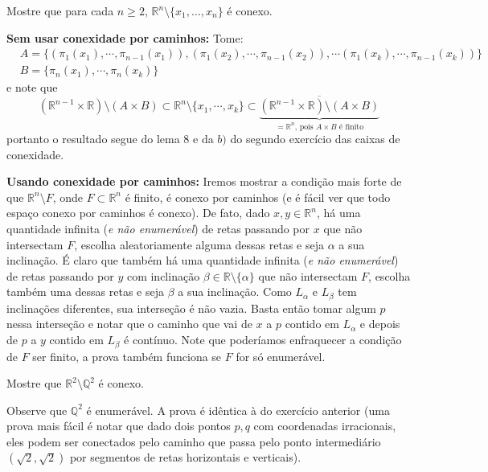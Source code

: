 \begin{Mybox}
Mostre que para cada $n \geq 2$, $\mathbb{R}^n \setminus \{x_1, \ldots, x_n \}$ é conexo.
\vspace{-.4cm}
\end{Mybox}
\vspace{-.5cm}
\begin{dem}
\textbf{Sem usar conexidade por caminhos:} Tome:
        \begin{align*}
         &A = \{(\pi_1(x_1), \cdots, \pi_{n-1}(x_1)) , (\pi_1(x_2), \cdots, \pi_{n-1}(x_2)), \cdots (\pi_1(x_k), \cdots, \pi_{n-1}(x_k)) \}\\
        &B = \{\pi_n(x_1), \cdots, \pi_n(x_k) \}
        \end{align*}
        e note que $$(\mathbb{R}^{n-1} \times \mathbb{R}) \setminus (A \times B) \subset \mathbb{R}^{n} \setminus \{x_1, \cdots, x_k \} \subset \underbrace{\overline{(\mathbb{R}^{n-1} \times \mathbb{R}) \setminus (A \times B)}}_\text{$= \mathbb{R}^n$, pois $A \times B$ é finito}$$
        portanto o resultado segue do lema $8$ e da $b)$ do segundo exercício das caixas de conexidade. \par 
\textbf{Usando conexidade por caminhos:} Iremos mostrar a condição mais forte de que $\mathbb{R}^n \setminus F$, onde $F \subset \mathbb{R}^n$ é finito, é conexo por caminhos (e é fácil ver que todo espaço conexo por caminhos é conexo). De fato, dado $x,y \in \mathbb{R}^n$, há uma quantidade infinita (\textit{e não enumerável}) de retas passando por $x$ que não intersectam $F$, escolha aleatoriamente alguma dessas retas e seja $\alpha$ a sua inclinação. É claro que também há uma quantidade infinita (\textit{e não enumerável}) de retas passando por $y$ com inclinação $\beta \in \mathbb{R} \setminus \{\alpha\}$ que não intersectam $F$, escolha também uma dessas retas e seja $\beta$ a sua inclinação. Como $L_\alpha$ e $L_\beta$ tem inclinações diferentes, sua interseção é não vazia. Basta então tomar algum $p$ nessa interseção e notar que o caminho que vai de $x$ a $p$ contido em $L_\alpha$ e depois de $p$ a $y$ contido em $L_\beta$ é contínuo. Note que poderíamos enfraquecer a condição de $F$ ser finito, a prova também funciona se $F$ for só enumerável.
\end{dem}

\begin{Mybox}
Mostre que $\mathbb{R}^2 \setminus \mathbb{Q}^2$ é conexo. 
\vspace{-.4cm}
\end{Mybox}
\vspace{-.5cm}
\begin{dem}
Observe que $\mathbb{Q}^2$ é enumerável. A prova é idêntica à do exercício anterior (uma prova mais fácil é notar que dado dois pontos $p, q$ com coordenadas irracionais, eles podem ser conectados pelo caminho que passa pelo ponto intermediário $(\sqrt{2}, \sqrt{2})$ por segmentos de retas horizontais e verticais).
\end{dem}

